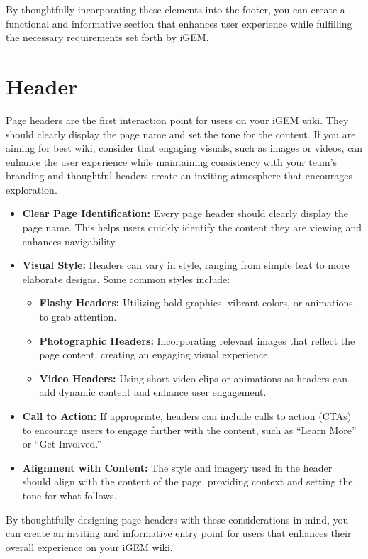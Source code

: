 By thoughtfully incorporating these elements into the footer, you can create a functional and informative section that enhances user experience while fulfilling the necessary requirements set forth by iGEM\@.


\section{Header} 
Page headers are the first interaction point for users on your iGEM wiki.
They should clearly display the page name and set the tone for the content.
If you are aiming for best wiki, consider that engaging visuals, such as images or videos, can enhance the user experience while maintaining consistency with your team’s branding and thoughtful headers create an inviting atmosphere that encourages exploration.


\begin{itemize}
    \item \textbf{Clear Page Identification:}
    Every page header should clearly display the page name.
    This helps users quickly identify the content they are viewing and enhances navigability.

    \item \textbf{Visual Style:}
    Headers can vary in style, ranging from simple text to more elaborate designs.
    Some common styles include:
    \begin{itemize}
        \item \textbf{Flashy Headers:} Utilizing bold graphics, vibrant colors, or animations to grab attention.
        \item \textbf{Photographic Headers:} Incorporating relevant images that reflect the page content, creating an engaging visual experience.
        \item \textbf{Video Headers:} Using short video clips or animations as headers can add dynamic content and enhance user engagement.
    \end{itemize}

    \item \textbf{Call to Action:}
    If appropriate, headers can include calls to action (CTAs) to encourage users to engage further with the content, such as ``Learn More'' or ``Get Involved.''

    \item \textbf{Alignment with Content:}
    The style and imagery used in the header should align with the content of the page, providing context and setting the tone for what follows.
\end{itemize}
By thoughtfully designing page headers with these considerations in mind, you can create an inviting and informative entry point for users that enhances their overall experience on your iGEM wiki.


